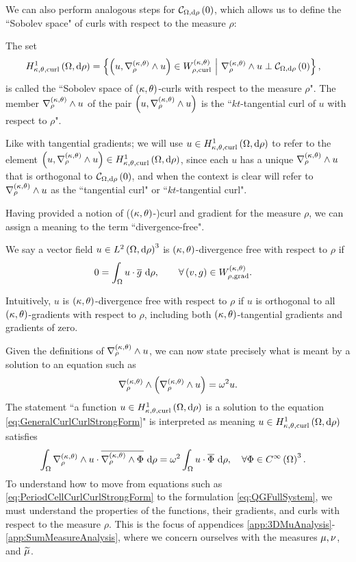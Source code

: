 We can also perform analogous steps for $\mathcal{C}_{ \Omega, \mathrm{d}\rho}\left( 0 \right)$, which allows us to define the ``Sobolev space" of curls with respect to the measure $\rho$:
\begin{definition} \label{def:CurlSobSpace}
	The set
	\begin{align*}
		H^1_{\kappa,\theta,\mathrm{curl}}\left( \Omega, \mathrm{d}\rho \right) &= \left\{  \left( u, \nabla_{\rho}^{\left( \kappa, \theta \right)}\wedge u \right)\in W^{\left( \kappa, \theta \right)}_{\rho,\mathrm{curl}} \ \middle\vert \  \nabla_{\rho}^{\left( \kappa, \theta \right)}\wedge u \perp \mathcal{C}_{ \Omega, \mathrm{d}\rho}\left( 0 \right)  \right\},
	\end{align*}
	is called the ``Sobolev space of $\left( \kappa, \theta \right)$-curls with respect to the measure $\rho$".
	The member $\nabla_{\rho}^{\left( \kappa, \theta \right)}\wedge u$ of the pair $\left( u, \nabla_{\rho}^{\left( \kappa, \theta \right)}\wedge u \right)$ is the ``$kt$-tangential curl of $u$ with respect to $\rho$".
\end{definition}
Like with tangential gradients; we will use $u\in H^1_{\kappa,\theta,\mathrm{curl}}\left( \Omega, \mathrm{d}\rho \right)$ to refer to the element $\left( u, \nabla_{\rho}^{\left( \kappa, \theta \right)}\wedge u \right)\in H^1_{\kappa,\theta,\mathrm{curl}}\left( \Omega, \mathrm{d}\rho \right)$, since each $u$ has a unique $\nabla_{\rho}^{\left( \kappa, \theta \right)}\wedge u$ that is orthogonal to $\mathcal{C}_{ \Omega, \mathrm{d}\rho}\left( 0 \right)$, and when the context is clear will refer to $\nabla_{\rho}^{\left( \kappa, \theta \right)}\wedge u$ as the ``tangential curl" or ``$kt$-tangential curl".

Having provided a notion of ($\left( \kappa, \theta \right)$-)curl and gradient for the measure $\rho$, we can assign a meaning to the term ``divergence-free".
\begin{definition} \label{def:ktDivergenceFree}
We say a vector field $u\in L^{2}\left( \Omega,\mathrm{d}\rho \right)^3$ is $\left( \kappa, \theta \right)$-divergence free with respect to $\rho$ if 
\begin{align*}
	0 &= \int_{\Omega} u\cdot\overline{g}  \ \mathrm{d}\rho, \qquad\forall \left( v,g \right)\in W^{\left( \kappa, \theta \right)}_{\rho,\mathrm{grad}}.
\end{align*}
\end{definition}
Intuitively, $u$ is $\left( \kappa, \theta \right)$-divergence free with respect to $\rho$ if $u$ is orthogonal to all $\left( \kappa, \theta \right)$-gradients with respect to $\rho$, including both $\left( \kappa, \theta \right)$-tangential gradients and gradients of zero.

Given the definitions of $\nabla_{\rho}^{\left( \kappa, \theta \right)}\wedge u$, we can now state precisely what is meant by a solution to an equation such as 
\begin{align} \label{eq:GeneralCurlCurlStrongForm}
	\nabla_{\rho}^{\left( \kappa, \theta \right)}\wedge \left(  \nabla_{\rho}^{\left( \kappa, \theta \right)}\wedge u  \right) = \omega^2 u.
\end{align}
The statement ``a function $u\in H^1_{\kappa,\theta,\mathrm{curl}}\left( \Omega, \mathrm{d}\rho \right)$ is a solution to the equation \eqref{eq:GeneralCurlCurlStrongForm}" is interpreted as meaning $u\in H^1_{\kappa,\theta,\mathrm{curl}}\left( \Omega, \mathrm{d}\rho \right)$ satisfies
\begin{align*}
	\int_{\Omega} \nabla_{\rho}^{\left( \kappa, \theta \right)}\wedge u \cdot \overline{\nabla_{\rho}^{\left( \kappa, \theta \right)}\wedge\Phi}  \ \mathrm{d}\rho &= \omega^2\int_{\Omega} u\cdot\overline{\Phi} \ \mathrm{d}\rho, \quad\forall\Phi\in C^{\infty}\left( \Omega \right)^3.
\end{align*}
To understand how to move from equations such as \eqref{eq:PeriodCellCurlCurlStrongForm} to the formulation \eqref{eq:QGFullSystem}, we must understand the properties of the functions, their gradients, and curls with respect to the measure $\rho$.
This is the focus of appendices \ref{app:3DMuAnalysis}-\ref{app:SumMeasureAnalysis}, where we concern ourselves with the measures $\mu, \nu$, and $\widetilde{\mu}$.

